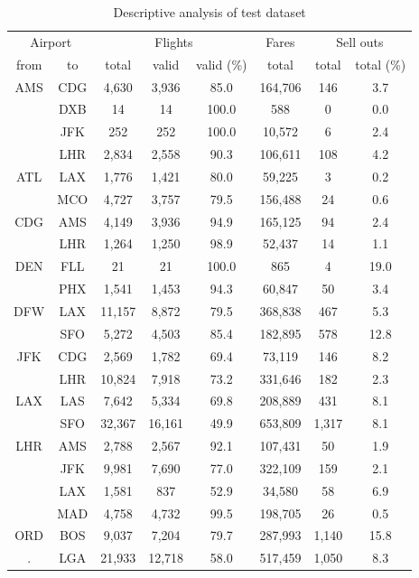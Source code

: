\begin{table}
\centering
\footnotesize
\begin{tabular}{c c | c c c | c | c c}
\toprule
\multicolumn{2}{c|}{Airport}  & \multicolumn{3}{c|}{Flights} & Fares & \multicolumn{2}{c}{Sell outs} \\[.4ex]
from &  to  & total  & valid  & valid (\%)  &  total  &  total  &  total (\%) \\
\midrule
AMS  &  CDG  &   4,630  &   3,936  &   85.0  &  164,706  &    146  &   3.7 \\
~    &  DXB  &      14  &      14  &  100.0  &      588  &      0  &   0.0 \\
~    &  JFK  &     252  &     252  &  100.0  &   10,572  &      6  &   2.4 \\
~    &  LHR  &   2,834  &   2,558  &   90.3  &  106,611  &    108  &   4.2 \\[.5ex]
ATL  &  LAX  &   1,776  &   1,421  &   80.0  &   59,225  &      3  &   0.2 \\
~    &  MCO  &   4,727  &   3,757  &   79.5  &  156,488  &     24  &   0.6 \\[.5ex]
CDG  &  AMS  &   4,149  &   3,936  &   94.9  &  165,125  &     94  &   2.4 \\
~    &  LHR  &   1,264  &   1,250  &   98.9  &   52,437  &     14  &   1.1 \\[.5ex]
DEN  &  FLL  &      21  &      21  &  100.0  &      865  &      4  &  19.0 \\
~    &  PHX  &   1,541  &   1,453  &   94.3  &   60,847  &     50  &   3.4 \\[.5ex]
DFW  &  LAX  &  11,157  &   8,872  &   79.5  &  368,838  &    467  &   5.3 \\
~    &  SFO  &   5,272  &   4,503  &   85.4  &  182,895  &    578  &  12.8 \\[.5ex]
JFK  &  CDG  &   2,569  &   1,782  &   69.4  &   73,119  &    146  &   8.2 \\
~    &  LHR  &  10,824  &   7,918  &   73.2  &  331,646  &    182  &   2.3 \\[.5ex]
LAX  &  LAS  &   7,642  &   5,334  &   69.8  &  208,889  &    431  &   8.1 \\
~    &  SFO  &  32,367  &  16,161  &   49.9  &  653,809  &  1,317  &   8.1 \\[.5ex]
LHR  &  AMS  &   2,788  &   2,567  &   92.1  &  107,431  &     50  &   1.9 \\
~    &  JFK  &   9,981  &   7,690  &   77.0  &  322,109  &    159  &   2.1 \\
~    &  LAX  &   1,581  &     837  &   52.9  &   34,580  &     58  &   6.9 \\
~    &  MAD  &   4,758  &   4,732  &   99.5  &  198,705  &     26  &   0.5 \\[.5ex]
ORD  &  BOS  &   9,037  &   7,204  &   79.7  &  287,993  &  1,140  &  15.8 \\
.    &  LGA  &  21,933  &  12,718  &   58.0  &  517,459  &  1,050  &   8.3 \\
\bottomrule
\end{tabular}
\caption{Descriptive analysis of test dataset}
\label{tbl:DescriptiveAnalysisTestDataset}
\end{table}


